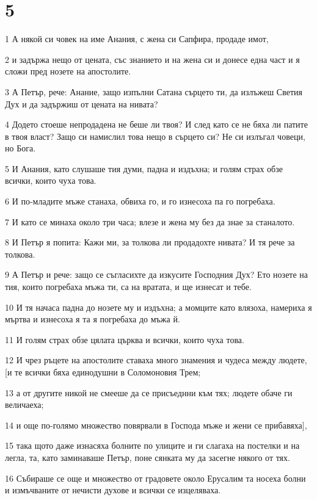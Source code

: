 \chapter{5}

\par 1 А някой си човек на име Анания, с жена си Сапфира, продаде имот,
\par 2 и задържа нещо от цената, със знанието и на жена си и донесе една част и я сложи пред нозете на апостолите.
\par 3 А Петър, рече: Анание, защо изпълни Сатана сърцето ти, да излъжеш Светия Дух и да задържиш от цената на нивата?
\par 4 Додето стоеше непродадена не беше ли твоя? И след като се не бяха ли патите в твоя власт? Защо си намислил това нещо в сърцето си? Не си излъгал човеци, но Бога.
\par 5 И Анания, като слушаше тия думи, падна и издъхна; и голям страх обзе всички, които чуха това.
\par 6 И по-младите мъже станаха, обвиха го, и го изнесоха па го погребаха.
\par 7 И като се минаха около три часа; влезе и жена му без да знае за станалото.
\par 8 И Петър я попита: Кажи ми, за толкова ли продадохте нивата? И тя рече за толкова.
\par 9 А Петър и рече: защо се съгласихте да изкусите Господния Дух? Ето нозете на тия, които погребаха мъжа ти, са на вратата, и ще изнесат и тебе.
\par 10 И тя начаса падна до нозете му и издъхна; а момците като влязоха, намериха я мъртва и изнесоха я та я погребаха до мъжа й.
\par 11 И голям страх обзе цялата църква и всички, които чуха това.
\par 12 И чрез ръцете на апостолите ставаха много знамения и чудеса между людете, [и те всички бяха единодушни в Соломоновия Трем;
\par 13 а от другите никой не смееше да се присъеднни към тях; людете обаче ги величаеха;
\par 14 и още по-голямо множество повярвали в Господа мъже и жени се прибавяха],
\par 15 така щото даже изнасяха болните по улиците и ги слагаха на постелки и на легла, та, като заминаваше Петър, поне сянката му да засегне някого от тях.
\par 16 Събираше се още и множество от градовете около Ерусалим та носеха болни и измъчваните от нечисти духове и всички се изцеляваха.
